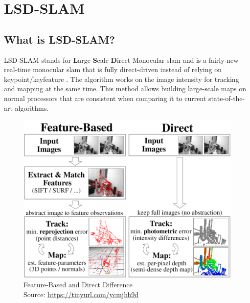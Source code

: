 
\chapter{LSD-SLAM\authorA}\label{ref:lsdslam}

\section{What is LSD-SLAM?}
LSD-SLAM stands for \textbf{L}arge-\textbf{S}cale \textbf{D}irect Monocular \gls{slam} and is a fairly new real-time monocular \gls{slam} that is fully direct-driven instead of relying on keypoint/keyfeature \cite{lsdslam_eccv}. The algorithm works on the image intensity for tracking and mapping at the same time.\newline
This method allows building large-scale maps on normal processors that are consistent when comparing it to current state-of-the-art algorithms. \newline
\begin{figure}[h]
	\centering
	\includegraphics[height=0.5\textwidth]{./media/images/direct-vs-feature-based.png}
  	\caption{Feature-Based and Direct Difference
  	\\Source: \url{https://tinyurl.com/ycmjhb9d}}
  	\label{featurebased_direct_difference}
\end{figure}

